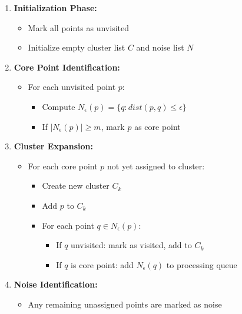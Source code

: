 \documentclass[a4paper, 11pt]{article}
\begin{document}
\begin{enumerate}
    \item \textbf{Initialization Phase:}
    \begin{itemize}
        \item Mark all points as unvisited
        \item Initialize empty cluster list $C$ and noise list $N$
    \end{itemize}

    \item \textbf{Core Point Identification:}
    \begin{itemize}
        \item For each unvisited point $p$:
            \begin{itemize}
                \item Compute $N_{\epsilon}(p) = \{q : dist(p,q) \leq \epsilon\}$
                \item If $|N_{\epsilon}(p)| \geq m$, mark $p$ as core point
            \end{itemize}
    \end{itemize}

    \item \textbf{Cluster Expansion:}
    \begin{itemize}
        \item For each core point $p$ not yet assigned to cluster:
            \begin{itemize}
                \item Create new cluster $C_k$
                \item Add $p$ to $C_k$
                \item For each point $q \in N_{\epsilon}(p)$:
                    \begin{itemize}
                        \item If $q$ unvisited: mark as visited, add to $C_k$
                        \item If $q$ is core point: add $N_{\epsilon}(q)$ to processing queue
                    \end{itemize}
            \end{itemize}
    \end{itemize}

    \item \textbf{Noise Identification:}
    \begin{itemize}
        \item Any remaining unassigned points are marked as noise
    \end{itemize}
\end{enumerate}
\end{document}
